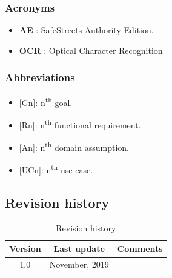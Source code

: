 \documentclass{article}
\begin{document}
			\subsubsection{Acronyms}
				\begin{itemize}
					\item \textbf{AE} \label{AE}: SafeStreets Authority Edition.
					\item \textbf{OCR} \label{OCR}: Optical Character Recognition
				\end{itemize}
			\subsubsection{Abbreviations}
				\begin{itemize}
					\item {[Gn]}: n\textsuperscript{th} goal.
					\item {[Rn]}: n\textsuperscript{th} functional requirement.
					\item {[An]}: n\textsuperscript{th} domain assumption.
					\item {[UCn]}: n\textsuperscript{th} use case.
				\end{itemize}
		\subsection{Revision history}
			\begin{table}[h]
				\centering
				\begin{tabular}{c c c}
					\hline
					\textbf{Version} & \textbf{Last update} & \textbf{Comments} \\ 
					\hline
					1.0 &  \nth{10} November, 2019  & \\
					\hline
				\end{tabular}
				\caption{Revision history}
				\label{fig:Revision history}
			\end{table}
		\clearpage	
\end{document}

